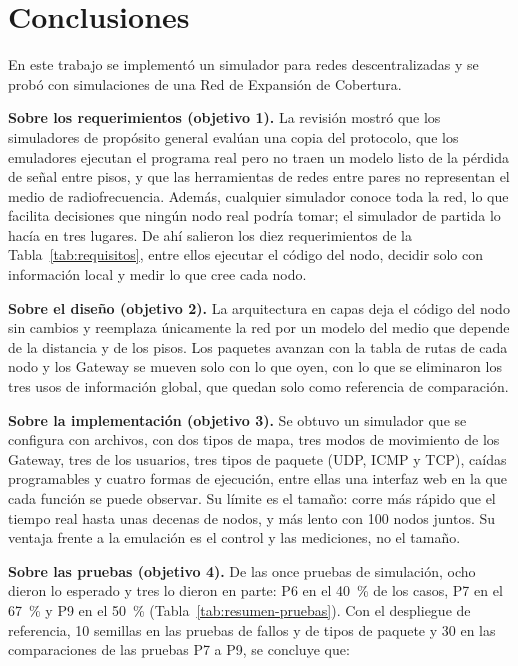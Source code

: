 \section{Conclusiones}
\label{sec:conclusiones}

En este trabajo se implementó un simulador para redes descentralizadas y se
probó con simulaciones de una Red de Expansión de Cobertura.

\textbf{Sobre los requerimientos (objetivo 1).} La revisión mostró que los
simuladores de propósito general evalúan una copia del protocolo, que los
emuladores ejecutan el programa real pero no traen un modelo listo de la pérdida
de señal entre pisos, y que las herramientas de redes entre pares no representan
el medio de radiofrecuencia. Además, cualquier simulador conoce toda la red, lo
que facilita decisiones que ningún nodo real podría tomar; el simulador de
partida lo hacía en tres lugares. De ahí salieron los diez requerimientos de la
Tabla~\ref{tab:requisitos}, entre ellos ejecutar el código del nodo, decidir
solo con información local y medir lo que cree cada nodo.

\textbf{Sobre el diseño (objetivo 2).} La arquitectura en capas deja el código
del nodo sin cambios y reemplaza únicamente la red por un modelo del medio que
depende de la distancia y de los pisos. Los paquetes avanzan con la tabla de
rutas de cada nodo y los Gateway se mueven solo con lo que oyen, con lo que se
eliminaron los tres usos de información global, que quedan solo como referencia
de comparación.

\textbf{Sobre la implementación (objetivo 3).} Se obtuvo un simulador que se
configura con archivos, con dos tipos de mapa, tres modos de movimiento de los
Gateway, tres de los usuarios, tres tipos de paquete (UDP, ICMP y TCP), caídas
programables y cuatro formas de ejecución, entre ellas una interfaz web en la
que cada función se puede observar. Su límite es el tamaño: corre más rápido
que el tiempo real hasta unas decenas de nodos, y más lento con 100 nodos
juntos. Su ventaja frente a la emulación es el control y las mediciones, no el
tamaño.

\textbf{Sobre las pruebas (objetivo 4).} De las once pruebas de simulación,
ocho dieron lo esperado y tres lo dieron en parte: P6 en el 40~\% de los
casos, P7 en el 67~\% y P9 en el 50~\% (Tabla~\ref{tab:resumen-pruebas}). Con el despliegue de referencia, 10
semillas en las pruebas de fallos y de tipos de paquete y 30 en las
comparaciones de las pruebas P7 a P9, se concluye que:

